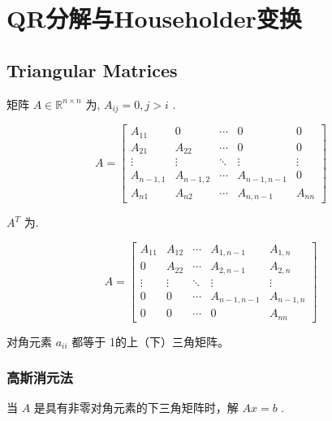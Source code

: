 \chapter{QR分解与Householder变换}

\section{Triangular Matrices}

\begin{definition}
    矩阵 $  {A} \in \mathbb{R}^{n \times n} $ 为, $ A_{i j}=0, j>i $ .

    $$ A=\left[\begin{array}{ccccc}A_{11} & 0 & \cdots & 0 & 0 \\ A_{21} & A_{22} & \cdots & 0 & 0 \\ \vdots & \vdots & \ddots & \vdots & \vdots \\ A_{n-1,1} & A_{n-1,2} & \cdots & A_{n-1, n-1} & 0 \\ A_{n 1} & A_{n 2} & \cdots & A_{n, n-1} & A_{n n}\end{array}\right] $$
\end{definition}

\begin{definition}
    $ A^{T} $ 为.

    $$ A=\left[\begin{array}{ccccc}A_{11} & A_{12} & \cdots & A_{1, n-1} & A_{1, n} \\ 0 & A_{22} & \cdots & A_{2, n-1} & A_{2, n} \\ \vdots & \vdots & \ddots & \vdots & \vdots \\ 0 & 0 & \cdots & A_{n-1, n-1} & A_{n-1, n} \\ 0 & 0 & \cdots & 0 & A_{n n}\end{array}\right] $$
\end{definition}

\begin{definition}
    对角元素 $ a_{i i} $ 都等于 1的上（下）三角矩阵。
\end{definition}

\subsection{高斯消元法}

\begin{problem}
    当 $ A $ 是具有非零对角元素的下三角矩阵时，解 $ A x=b $ .
\end{problem}

